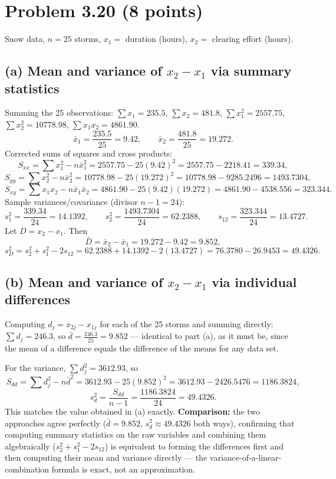 \documentclass[11pt]{article}
\begin{document}
\newpage
\section*{Problem 3.20 (8 points)}

\noindent Snow data, $n=25$ storms, $x_1=$ duration (hours), $x_2=$ clearing effort (hours).

\subsection*{(a) Mean and variance of $x_2-x_1$ via summary statistics}
Summing the 25 observations: $\sum x_1=235.5$, $\sum x_2=481.8$, $\sum x_1^2=2557.75$, $\sum x_2^2=10778.98$, $\sum x_1x_2=4861.90$.
\[
\bar x_1=\frac{235.5}{25}=9.42, \qquad \bar x_2=\frac{481.8}{25}=19.272.
\]
Corrected sums of squares and cross products:
\[
S_{xx}=\sum x_1^2-n\bar x_1^2=2557.75-25(9.42)^2=2557.75-2218.41=339.34,
\]
\[
S_{yy}=\sum x_2^2-n\bar x_2^2=10778.98-25(19.272)^2=10778.98-9285.2496=1493.7304,
\]
\[
S_{xy}=\sum x_1x_2-n\bar x_1\bar x_2=4861.90-25(9.42)(19.272)=4861.90-4538.556=323.344.
\]
Sample variances/covariance (divisor $n-1=24$):
\[
s_1^2=\frac{339.34}{24}=14.1392, \qquad s_2^2=\frac{1493.7304}{24}=62.2388, \qquad s_{12}=\frac{323.344}{24}=13.4727.
\]
Let $D=x_2-x_1$. Then
\[
\bar D=\bar x_2-\bar x_1=19.272-9.42=9.852,
\]
\[
s_D^2=s_2^2+s_1^2-2s_{12}=62.2388+14.1392-2(13.4727)=76.3780-26.9453=49.4326.
\]

\subsection*{(b) Mean and variance of $x_2-x_1$ via individual differences}
Computing $d_j=x_{2j}-x_{1j}$ for each of the 25 storms and summing directly: $\sum d_j=246.3$, so $\bar d=\frac{246.3}{25}=9.852$ — identical to part (a), as it must be, since the mean of a difference equals the difference of the means for any data set.

For the variance, $\sum d_j^2=3612.93$, so
\[
S_{dd}=\sum d_j^2-n\bar d^2=3612.93-25(9.852)^2=3612.93-2426.5476=1186.3824,
\]
\[
s_d^2=\frac{S_{dd}}{n-1}=\frac{1186.3824}{24}=49.4326.
\]
This matches the value obtained in (a) exactly. \textbf{Comparison:} the two approaches agree perfectly ($\bar d=9.852$, $s_d^2\approx49.4326$ both ways), confirming that computing summary statistics on the raw variables and combining them algebraically ($s_2^2+s_1^2-2s_{12}$) is equivalent to forming the differences first and then computing their mean and variance directly — the variance-of-a-linear-combination formula is exact, not an approximation.
\end{document}
